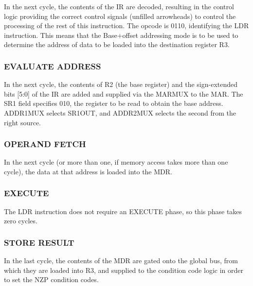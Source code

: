\documentclass{patt}
\begin{document}
In the next cycle, the contents of the IR are decoded, resulting in
the control logic providing the correct control signals (unfilled
arrowheads) to control the processing of the rest of this instruction.
The opcode is 0110, identifying the LDR instruction.  This means that
the Base$+$offset addressing mode is to be used to determine the
address of data to be loaded into the destination register R3.

\subsubsection{EVALUATE ADDRESS}

In the next cycle, the contents of R2 (the base register) and the
sign-extended bits [5:0] of the IR are added and supplied via the
MARMUX to the MAR.  The SR1 field specifies 010, the register to be
read to obtain the base address.  ADDR1MUX selects SR1OUT, and
ADDR2MUX selects the second from the right source.

\subsubsection{OPERAND FETCH}

In the next cycle (or more than one, if memory access takes more than
one cycle), the data at that address is loaded into the MDR.

\subsubsection{EXECUTE}

The LDR instruction does not require an EXECUTE phase, so this phase takes zero cycles.

\subsubsection{STORE RESULT}

In the last cycle, the contents of the MDR are gated onto the global bus, 
from which they are loaded into R3, and supplied to the condition code logic 
in order to set the NZP condition codes.
\end{document}
